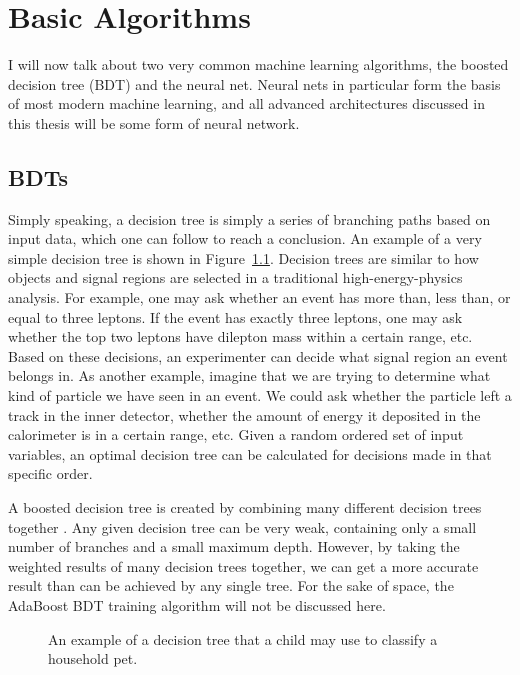 \chapter{Basic Algorithms}

I will now talk about two very common machine learning algorithms, the boosted decision tree (BDT) and the neural net. Neural nets in particular form the basis of most modern machine learning, and all advanced architectures discussed in this thesis will be some form of neural network.

\section{BDTs}

Simply speaking, a decision tree is simply a series of branching paths based on input data, which one can follow to reach a conclusion. An example of a very simple decision tree is shown in Figure~\ref{decision_tree}. Decision trees are similar to how objects and signal regions are selected in a traditional high-energy-physics analysis. For example, one may ask whether an event has more than, less than, or equal to three leptons. If the event has exactly three leptons, one may ask whether the top two leptons have dilepton mass within a certain range, etc. Based on these decisions, an experimenter can decide what signal region an event belongs in. As another example, imagine that we are trying to determine what kind of particle we have seen in an event. We could ask whether the particle left a track in the inner detector, whether the amount of energy it deposited in the calorimeter is in a certain range, etc. Given a random ordered set of input variables, an optimal decision tree can be calculated for decisions made in that specific order.

A boosted decision tree is created by combining many different decision trees together \cite{BDT}. Any given decision tree can be very weak, containing only a small number of branches and a small maximum depth. However, by taking the weighted results of many decision trees together, we can get a more accurate result than can be achieved by any single tree. For the sake of space, the AdaBoost BDT training algorithm will not be discussed here.

\begin{figure}[t]
    \centering
    \caption{An example of a decision tree that a child may use to classify a household pet.}
    \label{decision_tree}
\end{figure}

